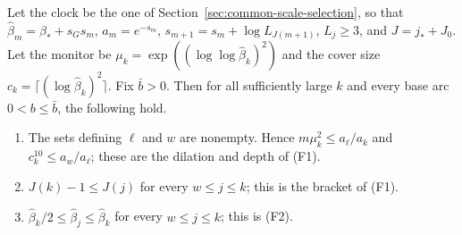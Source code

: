\begin{lemma}
\label{lem:ex-lattice-firesky-clock-fields}
Let the clock be the one of Section~\ref{sec:common-scale-selection}, so
that $\widehat\beta_m=\beta_*+s_Gs_m$, $a_m=e^{-s_m}$,
$s_{m+1}=s_m+\log L_{J(m+1)}$, $L_j\ge3$, and $J=j_*+J_0$. Let the
monitor be $\mu_k=\exp((\log\log\widehat\beta_k)^2)$ and the cover size
$c_k=\lceil(\log\widehat\beta_k)^2\rceil$. Fix $\bar b>0$. Then for all
sufficiently large $k$ and every base arc $0<b\le\bar b$, the following
hold.
\begin{enumerate}
\item The sets defining $\ell$ and $w$ are nonempty. Hence
 $m\mu_k^2\le a_\ell/a_k$ and $c_k^{10}\le a_w/a_\ell$; these are the
 dilation and depth of (F1).
\item $J(k)-1\le J(j)$ for every $w\le j\le k$; this is the bracket of
 (F1).
\item $\widehat\beta_k/2\le\widehat\beta_j\le\widehat\beta_k$ for every
 $w\le j\le k$; this is (F2).
\end{enumerate}
\end{lemma}
